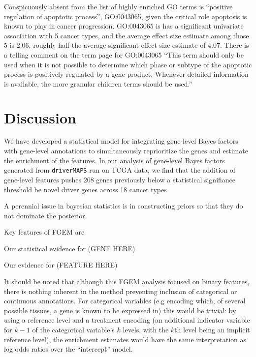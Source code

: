 Conspicuously absent from the list of highly enriched GO terms is ``positive regulation of apoptotic process'', GO:0043065, given the critical role apoptosis is known to play in cancer progression. GO:0043065 is has a significant univariate association with 5 cancer types, and the average effect size estimate among those 5 is 2.06, roughly half the average significant effect size estimate of 4.07. There is a telling comment on the term page for GO:0043065 ``This term should only be used when it is not possible to determine which phase or subtype of the apoptotic process is positively regulated by a gene product. Whenever detailed information is available, the more granular children terms should be used.''

\section{Discussion}
\label{sec:org3165b14}

We have developed a statistical model for integrating gene-level Bayes factors with gene-level annotations to simultaneously reprioritize the genes and estimate the enrichment of the features. In our analysis of gene-level Bayes factors generated from \texttt{driverMAPS} run on TCGA data, we find that the addition of gene-level features pushes 208 genes previously below a statistical signifiance threshold be novel driver genes across 18 cancer types


A perennial issue in bayesian statistics is in constructing priors so that they do not dominate the posterior.

Key features of FGEM are

Our statistical evidence for (GENE HERE)

Our evidence for (FEATURE HERE)

It should be noted that although this FGEM analysis focused on binary features, there is nothing inherent in the method preventing inclusion of categorical or continuous annotations.  For categorical variables (e.g encoding which, of several possible tissues, a gene is known to be expressed in) this would be
trivial: by using a reference level \cite{chambers1992statistical} and a treatment encoding (an additional indicator variable for $k-1$ of the categorical variable's $k$ levels, with the $k$th level being an implicit reference level), the enrichment estimates would have the same interpretation as log odds ratios over the ``intercept'' model.






